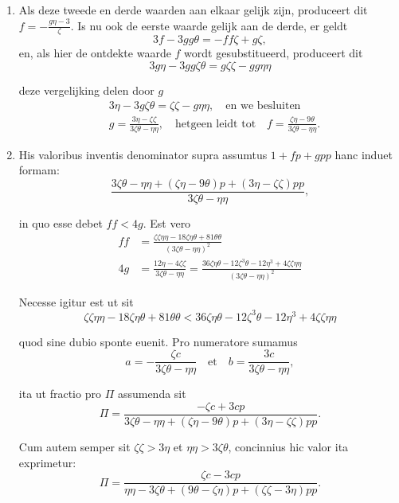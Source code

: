 \documentclass[10pt,a4paper]{article}
\newcommand{\switchenum}{\setcounter{enumi}{\arabic{enumi}-1}\switchcolumn}
\begin{document}
\begin{paracol}{2}
\begin{enumerate}[topsep=1px]
		\switchenum
		\item Als deze tweede en derde waarden aan elkaar gelijk zijn, produceert dit $f=-\frac{g\eta -3}{\zeta}$. Is nu ook de eerste waarde gelijk aan de derde, er geldt
		\[
			3f-3gg\theta = -ff \zeta + g \zeta,
		\]
		en, als hier de ontdekte waarde $f$ wordt gesubstitueerd, produceert dit
		\[
			3g\eta -3gg\zeta \theta = g\zeta \zeta - gg\eta \eta
		\]
		\par deze vergelijking delen door $g$ 
		\begin{align*}
			&3\eta - 3g\zeta \theta = \zeta \zeta - g\eta \eta, \quad \text{en we besluiten}\\
			&g= \frac{3\eta - \zeta \zeta}{3\zeta \theta - \eta \eta}, \quad \text{hetgeen leidt tot} \quad f = \frac{\zeta \eta - 9\theta}{3\zeta \theta - \eta \eta}.
		\end{align*}

		\switchcolumn*
		
		\item His valoribus inventis denominator supra assumtus $1+fp+gpp$ hanc induet formam:
		\[
			\frac{3\zeta \theta - \eta \eta + (\zeta \eta - 9\theta)p + (3\eta -\zeta \zeta)pp}{3\zeta \theta - \eta \eta},
		\]
		\par in quo esse debet $ff< 4g$. Est vero
		\begin{align*}
			ff &= \frac{\zeta \zeta \eta \eta -18\zeta \eta \theta + 81 \theta \theta}{(3\zeta \theta - \eta \eta)^2}\\
			4g &= \frac{12\eta - 4\zeta \zeta }{3\zeta \theta-\eta \eta} = \frac{36\zeta \eta \theta - 12 \zeta ^3\theta - 12 \eta^3+4\zeta \zeta \eta \eta}{(3\zeta \theta - \eta \eta)^2}
		\end{align*}
		\par Necesse igitur est ut sit
		\[
			\zeta \zeta \eta \eta -18 \zeta \eta \theta +81 \theta \theta < 36 \zeta \eta \theta - 12 \zeta^3\theta -12\eta^3 + 4 \zeta \zeta \eta \eta
		\]
		\par quod sine dubio sponte euenit. Pro numeratore sumamus
		\[
			a = - \frac{\zeta c}{3\zeta \theta - \eta \eta} \quad \text{et}\quad b = \frac{3c}{3\zeta \theta - \eta \eta},
		\]
		\par ita ut fractio pro $\Pi$ assumenda sit
		\[
			\Pi = \frac{-\zeta c + 3cp}{3\zeta \theta -\eta \eta +(\zeta \eta - 9\theta)p+(3\eta - \zeta \zeta)pp}.
		\]
		\par Cum autem semper sit $\zeta \zeta > 3\eta$ et $\eta \eta > 3\zeta \theta$, concinnius hic valor ita exprimetur:
		\[
			\Pi = \frac{\zeta c - 3cp }{\eta \eta - 3\zeta \theta +(9\theta - \zeta \eta)p + (\zeta \zeta - 3\eta)pp}.
		\]
		

\end{enumerate}
\end{paracol}
\end{document}

